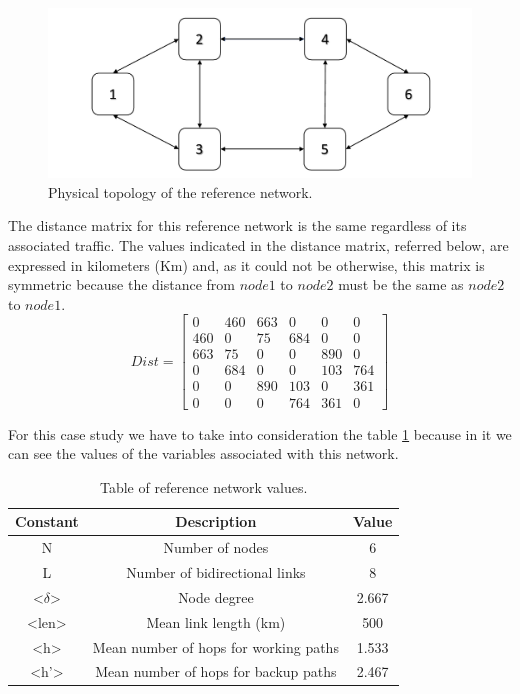 \begin{figure}[h!]
\centering
\includegraphics[width=\textwidth]{sdf/reference_network/figures/RedeTeste}
\caption{Physical topology of the reference network.}
\label{physical_top_ref_net}
\end{figure}

\vspace{11pt}
The distance matrix for this reference network is the same regardless of its associated traffic.
The values indicated in the distance matrix, referred below, are expressed in kilometers (Km) and, as it could not be otherwise, this matrix is symmetric because the distance from $node1$ to $node2$ must be the same as $node2$ to $node1$.\\

\[
Dist=
  \begin{bmatrix}
    0 & 460 & 663 & 0 & 0 & 0 \\
    460 & 0 & 75 & 684 & 0 & 0 \\
    663 & 75 & 0 & 0 & 890 & 0 \\
    0 & 684 & 0 & 0 & 103 & 764 \\
    0 & 0 & 890 & 103 & 0 & 361 \\
    0 & 0 & 0 & 764 & 361 & 0
  \end{bmatrix}
\]

\newpage
For this case study we have to take into consideration the table \ref{table_ref_net} because in it we can see the values of the variables associated with this network.

\begin{table}[h!]
\centering
\begin{tabular}{|| c | c | c||}
 \hline
 Constant & Description & Value \\
 \hline\hline
 N & Number of nodes & 6 \\
 L & Number of bidirectional links & 8 \\
 <$\delta$> & Node degree & 2.667 \\
 <len> & Mean link length (km) & 500 \\
 <h> & Mean number of hops for working paths & 1.533 \\
 <h'> & Mean number of hops for backup paths & 2.467 \\
 \hline
\end{tabular}
\caption{Table of reference network values.}
\label{table_ref_net}
\end{table}


